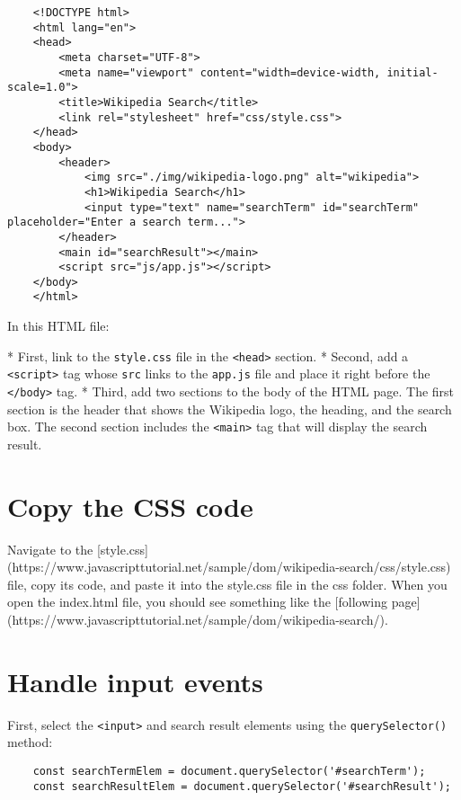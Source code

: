 \documentclass[11pt]{article}
\begin{document}
\begin{lstlisting}
    <!DOCTYPE html>
    <html lang="en">
    <head>
        <meta charset="UTF-8">
        <meta name="viewport" content="width=device-width, initial-scale=1.0">
        <title>Wikipedia Search</title>
        <link rel="stylesheet" href="css/style.css">
    </head>
    <body>
        <header>
            <img src="./img/wikipedia-logo.png" alt="wikipedia">
            <h1>Wikipedia Search</h1>
            <input type="text" name="searchTerm" id="searchTerm" placeholder="Enter a search term...">
        </header>
        <main id="searchResult"></main>
        <script src="js/app.js"></script>
    </body>
    </html>
\end{lstlisting}

In this HTML file:

* First, link to the \verb|style.css| file in the \verb|<head>| section.
* Second, add a \verb|<script>| tag whose \verb|src| links to the \verb|app.js| file
and place it right before the \verb|</body>| tag.
* Third, add two sections to the body of the HTML page.
The first section is the header that shows the Wikipedia logo, the
heading, and the search box. The second section includes the \verb|<main>|
tag that will display the search result.

\section*{Copy the CSS code}

Navigate to the [style.css](https://www.javascripttutorial.net/sample/dom/wikipedia-search/css/style.css) file, copy its code, and paste it into the
style.css file in the css folder. When you open the index.html file,
you should see something like the [following page](https://www.javascripttutorial.net/sample/dom/wikipedia-search/).

\section*{Handle input events}

First, select the \verb|<input>| and search result elements using the
\verb|querySelector()| method:

\begin{lstlisting}
    const searchTermElem = document.querySelector('#searchTerm');
    const searchResultElem = document.querySelector('#searchResult');
\end{lstlisting}
\end{document}

